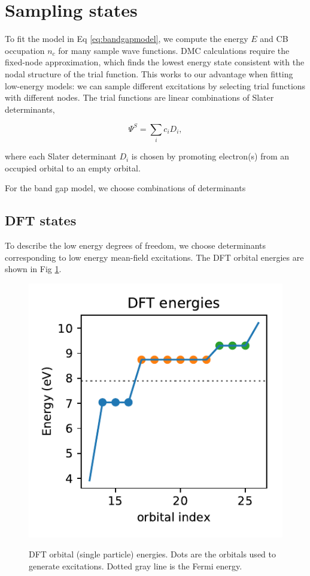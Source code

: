 \section {Sampling states}

To fit the model in Eq \ref{eq:bandgapmodel}, we compute the energy $E$ and CB occupation $n_c$ for many sample wave functions.
DMC calculations require the fixed-node approximation, which finds the lowest energy state consistent with the nodal structure of the trial function.
This works to our advantage when fitting low-energy models: we can sample different excitations by selecting trial functions with different nodes. 
The trial functions are linear combinations of Slater determinants,

\begin{equation}
\Psi^S = \sum_i c_i D_i,
\end{equation}

where each Slater determinant $D_i$ is chosen by promoting electron(s) from an occupied orbital to an empty orbital.


For the band gap model, we choose combinations of determinants 


\subsection{DFT states}
To describe the low energy degrees of freedom, we choose determinants corresponding to low energy mean-field excitations.
The DFT orbital energies are shown in Fig \ref{fig:dft_energies}.

\begin{figure}[h]
\begin{center}
\includegraphics{images/dft_energies_k888.pdf}
\label{fig:dft_energies}
\caption{DFT orbital (single particle) energies. 
Dots are the orbitals used to generate excitations. 
Dotted gray line is the Fermi energy.}
\end{center}
\end{figure}

